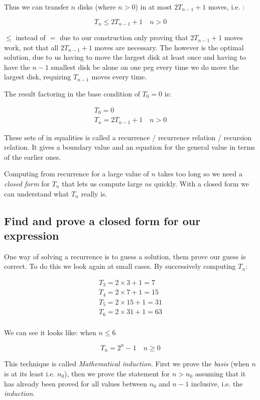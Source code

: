 \documentclass[12pt letter]{report}
\begin{document}
Thus we can transfer $n$ disks (where $n > 0$) in at most $2T_{n-1} + 1$ moves, i.e. :

\[
	T_n \leq 2T_{n-1} + 1 \quad n > 0
\]

$\leq$ instead of $=$ due to our construction only proving that $2T_{n-1} + 1$ moves work, not that all $2T_{n-1} + 1$
moves are necessary. The however is the optimal solution, due to us having to move the largest disk at least once and
having to have the $n-1$ smallest disk be alone on one peg every time we do move the largest disk, requiring $T_{n-1}$
moves every time.

The result factoring in the base condition of $T_0 = 0$ is:

\begin{gather*}
	T_0 = 0\\
	T_n = 2T_{n-1} + 1 \quad n > 0
\end{gather*}

These sets of in equalities is called a recurrence / recurrence relation / recursion relation. It gives a boundary value
and an equation for the general value in terms of the earlier ones.

Computing from recurrence for a large value of $n$ takes too long so we need a \textit{closed form} for $T_n$ that lets
us compute large $n$s quickly. With a closed form we can understand what $T_n$ really is.

\subsection{Find and prove a closed form for our expression}\label{closed}

One way of solving a recurrence is to guess a solution, them prove our guess is correct. To do this we look again at
small cases. By successively computing $T_n$:

\begin{align*}
	T_3 = 2  \times  3 + 1 = 7   \\
	T_4 = 2  \times  7 + 1 = 15  \\
	T_5 = 2  \times  15 + 1 = 31 \\
	T_6 = 2  \times  31 + 1 = 63 \\
\end{align*}

We can see it looks like: when $n \leq 6$

\[
	T_n = 2^{n} - 1 \quad n \geq 0
\]

This technique is called \textit{Mathematical induction}. First we prove the \textit{basis}\label{basis} (when $n$ is at its least
i.e. $n_0$), then we prove the statement for $n > n_0$ assuming that it has already been proved for all values between
$n_0$ and $n - 1$ inclusive, i.e. the \textit{induction}\label{induction}.
\end{document}

